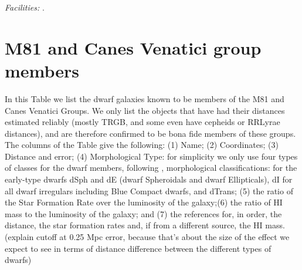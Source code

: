 \documentclass[12pt,preprint]{emulateapj}
\begin{document}

{\it Facilities:}  .


\appendix

\section{M81 and Canes Venatici group members}

In this Table we list the dwarf galaxies known to be members of the M81 and Canes Venatici Groups. We only list the objects 
that have had their distances estimated reliably (mostly TRGB, and some even have cepheids or RRLyrae distances), 
and are therefore confirmed to be bona fide members of these groups. The columns of the Table give the following:
(1) Name; (2) Coordinates; (3) Distance and error; (4) Morphological Type:  
for simplicity we only use four types of classes for the dwarf members, following \citep{m98},\citep{w11} 
morphological classifications: for the early-type dwarfs dSph and dE  
(dwarf Spheroidals and dwarf Ellipticals), dI for all dwarf irregulars including Blue
Compact dwarfs, and dTrans; (5) the ratio of the Star Formation Rate over the luminosity 
of the galaxy;(6) the ratio of HI mass to the luminosity of the galaxy; and (7) the references for, 
in order, the distance, the star formation rates and, if from a different source, the HI mass. 
(explain cutoff at 0.25 Mpc error, because that's about the size of the effect we expect to see in terms of distance difference between the different types of dwarfs)


\end{document}
